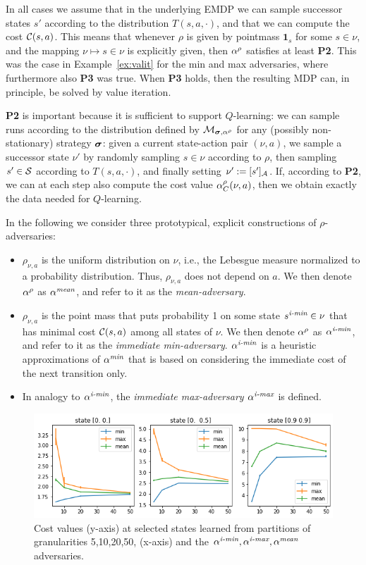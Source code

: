 \documentclass{llncs}
\begin{document}
In all cases we assume that in the underlying EMDP we can sample successor states $s'$ according to
the distribution $T(s,a,\cdot)$, and that we can compute the cost $\mathcal{C}(s,a)$. This means that
whenever $\rho$ is given by pointmass ${\boldsymbol 1}_s$ for some $s\in\nu$, and the mapping
$\nu\mapsto s\in\nu$ is explicitly given, then $\alpha^{\rho}$ satisfies at least {\bf P2}.
This was the case in Example~\ref{ex:valit} for the min and max adversaries, where furthermore also
{\bf P3} was true. When {\bf P3} holds, then the resulting MDP can, in principle,
be solved by value iteration.

{\bf P2} is important because it is sufficient to support $Q$-learning: we can sample runs according to
the distribution
defined by $\mathcal{M}_{\boldsymbol{\sigma},\alpha^{\rho}}$ for any (possibly non-stationary) strategy $\boldsymbol{\sigma}$:
given a current state-action pair $(\nu,a)$, we sample a successor state $\nu'$ by randomly sampling
$s\in\nu$ according to $\rho$, then sampling $s'\in\mathcal{S}$ according to $T(s,a,\cdot)$, and finally
setting $\nu':=[s']_{\mathcal{A}}$. If, according to {\bf P2}, we can at each step also compute the cost
value $\alpha^{\rho}_C(\nu,a)$, then we obtain exactly the data needed for $Q$-learning. 

In the following we consider three prototypical, explicit constructions of $\rho$-adversaries:
\begin{itemize}
\item $\rho_{\nu,a}$ is the uniform distribution on $\nu$, i.e., the Lebesgue measure normalized to a probability
distribution. Thus, $\rho_{\nu,a}$ does not depend on $a$. We then denote $\alpha^{\rho}$ as $\alpha^{\emph{mean}}$, and refer to
it as the \emph{mean-adversary}.
\item $\rho_{\nu,a}$ is the point mass that puts probability 1 on some state $s^{\emph{i-min}}\in\nu$ that has minimal
cost  $\mathcal{C}(s,a)$ among all states of $\nu$.   We then denote $\alpha^{\rho}$ as $\alpha^{\emph{i-min}}$, and refer to
it as the \emph{immediate min-adversary}. $\alpha^{\emph{i-min}}$ is a heuristic approximations of  $\alpha^{\emph{min}}$ that
is based on considering the immediate cost of the next transition only.
\item In analogy to $\alpha^{\emph{i-min}}$, the \emph{immediate max-adversary} $\alpha^{\emph{i-max}}$ is defined.
\end{itemize}

\begin{figure}[b]
\centering
\includegraphics[scale=0.5]{./Figures/minmaxmean2d+err.png}
\caption{Cost values (y-axis) at selected states learned from partitions of granularities 5,10,20,50, (x-axis)
and the $\alpha^{\emph{i-min}}, \alpha^{\emph{i-max}}, \alpha^{\emph{mean}}$ adversaries.\label{fig:minmax2d}}
\end{figure}
\end{document}

